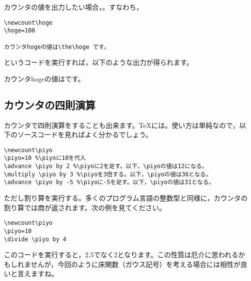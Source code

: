 \documentclass[autodetect-engine,dvipdfmx]{jsarticle}
\begin{document}
カウンタの値を出力したい場合，\verb@{}。すなわち，

\begin{tcolorbox}

\begin{verbatim}
\newcount\hoge
\hoge=100

カウンタhogeの値は\the\hoge です。
\end{verbatim}

\end{tcolorbox}

というコードを実行すれば，以下のような出力が得られます。

\begin{tcolorbox}
\newcount\hoge
{}

カウンタhogeの値は\the\hoge です。
\end{tcolorbox}

\subsection{カウンタの四則演算}

カウンタで四則演算をすることも出来ます。\TeX には\verb@{}\verb@{}。使い方は単純なので，以下のソースコードを見ればよく分かるでしょう。

\begin{tcolorbox}

\begin{verbatim}
\newcount\piyo
\piyo=10 %\piyoに10を代入
\advance \piyo by 2 %\piyoに2を足す。以下，\piyoの値は12になる。
\multiply \piyo by 3 %\piyoを3倍する。以下，\piyoの値は36となる。
\advance \piyo by -5 %\piyoに-5を足す。以下，\piyoの値は31となる。
\end{verbatim}

\end{tcolorbox}

ただし割り算を実行する\verb@{}。多くのプログラム言語の整数型と同様に，カウンタの割り算では商が返されます。次の例を見てください。

\begin{tcolorbox}

\begin{verbatim}
\newcount\piyo
\piyo=10
\divide \piyo by 4
\end{verbatim}

\end{tcolorbox}

このコードを実行すると，\verb@{}2.5でなく2となります。この性質は厄介に思われるかもしれませんが，今回のように床関数（ガウス記号）を考える場合には相性が良いと言えますね。
\end{document}

